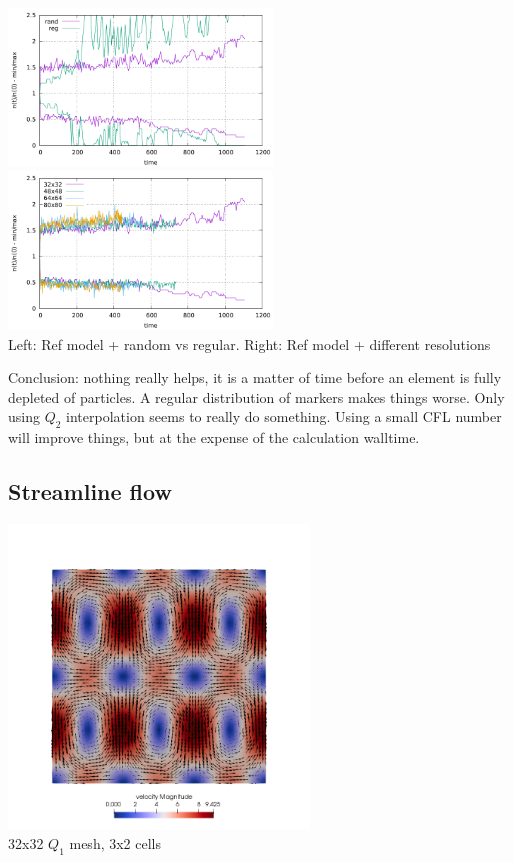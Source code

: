 \begin{center}
\includegraphics[width=7cm]{python_codes/fieldstone_30/results_solcx/markercount_reg}
\includegraphics[width=7cm]{python_codes/fieldstone_30/results_solcx/markercount_res}\\
{\captionfont Left: Ref model + random vs regular. Right: Ref model + different resolutions}
\end{center}

Conclusion: nothing really helps, it is a matter of time before an element is fully depleted of particles. 
A regular distribution of markers makes things worse. Only using $Q_2$ interpolation seems to really do 
something. Using a small CFL number will improve things, but at the expense of the calculation walltime. 

\newpage
\subsection*{Streamline flow}


\begin{center}
\includegraphics[width=8cm]{python_codes/fieldstone_30/results_streamline/vel}\\
{\captionfont 32x32 $Q_1$ mesh, 3x2 cells}
\end{center}


